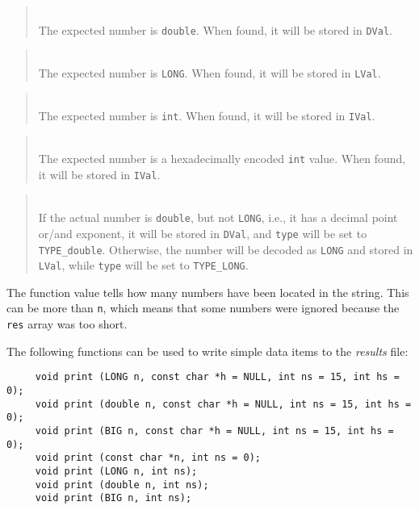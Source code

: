 \begin{quote}
\noindent{}\\ \hspace{0in}
The expected number is {\tt double}.
When found, it will be stored in {\tt DVal}.
\end{quote}

\begin{quote}
\noindent{}\\ \hspace{0in}
The expected number is {\tt LONG}.
When found, it will be stored in {\tt LVal}.
\end{quote}

\begin{quote}
\noindent{}\\ \hspace{0in}
The expected number is {\tt int}.
When found, it will be stored in {\tt IVal}.
\end{quote}

\begin{quote}
\noindent{}\\ \hspace{0in}
The expected number is a hexadecimally encoded {\tt int} value.
When found, it will be stored in {\tt IVal}.
\end{quote}

\begin{quote}
\noindent{}\\ \hspace{0in}
If the actual number is {\tt double}, but not {\tt LONG}, i.e., it has a decimal
point or/and exponent, it will be stored in {\tt DVal}, and {\tt type}
will be set to {\tt TYPE\_double}.
Otherwise, the number will be decoded as {\tt LONG} and stored in {\tt LVal},
while {\tt type} will be set to {\tt TYPE\_LONG}.
\end{quote}

The function value tells how many numbers have been located in the string.
This can be more than {\tt n}, which means that some numbers were ignored
because the {\tt res} array was too short.

\medskip

The following functions can be used to write simple data items
to the {\em results\/} file:
\begin{verbatim}
     void print (LONG n, const char *h = NULL, int ns = 15, int hs = 0);
     void print (double n, const char *h = NULL, int ns = 15, int hs = 0);
     void print (BIG n, const char *h = NULL, int ns = 15, int hs = 0);
     void print (const char *n, int ns = 0);
     void print (LONG n, int ns);
     void print (double n, int ns);
     void print (BIG n, int ns);
\end{verbatim}

